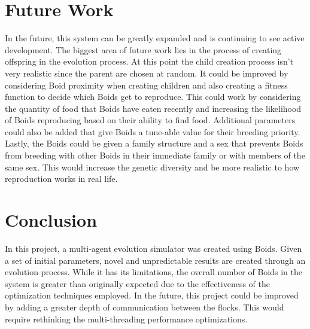 \documentclass{egpubl}
\begin{document}
\section{Future Work}
In the future, this system can be greatly expanded and is continuing to see active development. The biggest area of future work lies in the process of creating offspring in the evolution process. At this point the child creation process isn't very realistic since the parent are chosen at random. It could be improved by considering Boid proximity when creating children and also creating a fitness function to decide which Boids get to reproduce. This could work by considering the quantity of food that Boids have eaten recently and increasing the likelihood of Boids reproducing based on their ability to find food. Additional parameters could also be added that give Boids a tune-able value for their breeding priority. Lastly, the Boids could be given a family structure and a sex that prevents Boids from breeding with other Boids in their immediate family or with members of the same sex. This would increase the genetic diversity and be more realistic to how reproduction works in real life. 
\section{Conclusion}
In this project, a multi-agent evolution simulator was created using Boids. Given a set of initial parameters, novel and unpredictable results are created through an evolution process. While it has its limitations, the overall number of Boids in the system is greater than originally expected due to the effectiveness of the optimization techniques employed. In the future, this project could be improved by adding a greater depth of communication between the flocks. This would require rethinking the multi-threading performance optimizations.
\printbibliography                
\end{document}
